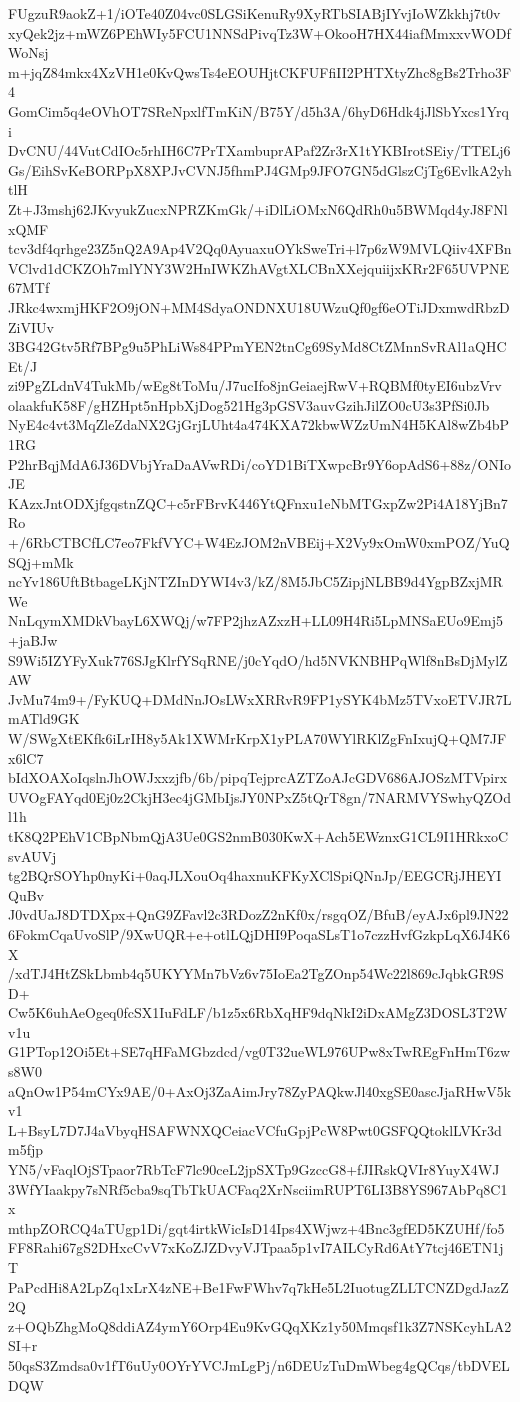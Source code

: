 FUgzuR9aokZ+1/iOTe40Z04vc0SLGSiKenuRy9XyRTbSIABjIYvjIoWZkkhj7t0v
xyQek2jz+mWZ6PEhWIy5FCU1NNSdPivqTz3W+OkooH7HX44iafMmxxvWODfWoNsj
m+jqZ84mkx4XzVH1e0KvQwsTs4eEOUHjtCKFUFfiII2PHTXtyZhc8gBs2Trho3F4
GomCim5q4eOVhOT7SReNpxlfTmKiN/B75Y/d5h3A/6hyD6Hdk4jJlSbYxcs1Yrqi
DvCNU/44VutCdIOc5rhIH6C7PrTXambuprAPaf2Zr3rX1tYKBIrotSEiy/TTELj6
Gs/EihSvKeBORPpX8XPJvCVNJ5fhmPJ4GMp9JFO7GN5dGlszCjTg6EvlkA2yhtlH
Zt+J3mshj62JKvyukZucxNPRZKmGk/+iDlLiOMxN6QdRh0u5BWMqd4yJ8FNlxQMF
tcv3df4qrhge23Z5nQ2A9Ap4V2Qq0AyuaxuOYkSweTri+l7p6zW9MVLQiiv4XFBn
VClvd1dCKZOh7mlYNY3W2HnIWKZhAVgtXLCBnXXejquiijxKRr2F65UVPNE67MTf
JRkc4wxmjHKF2O9jON+MM4SdyaONDNXU18UWzuQf0gf6eOTiJDxmwdRbzDZiVIUv
3BG42Gtv5Rf7BPg9u5PhLiWs84PPmYEN2tnCg69SyMd8CtZMnnSvRAl1aQHCEt/J
zi9PgZLdnV4TukMb/wEg8tToMu/J7ucIfo8jnGeiaejRwV+RQBMf0tyEI6ubzVrv
olaakfuK58F/gHZHpt5nHpbXjDog521Hg3pGSV3auvGzihJilZO0cU3s3PfSi0Jb
NyE4c4vt3MqZleZdaNX2GjGrjLUht4a474KXA72kbwWZzUmN4H5KAl8wZb4bP1RG
P2hrBqjMdA6J36DVbjYraDaAVwRDi/coYD1BiTXwpcBr9Y6opAdS6+88z/ONIoJE
KAzxJntODXjfgqstnZQC+c5rFBrvK446YtQFnxu1eNbMTGxpZw2Pi4A18YjBn7Ro
+/6RbCTBCfLC7eo7FkfVYC+W4EzJOM2nVBEij+X2Vy9xOmW0xmPOZ/YuQSQj+mMk
ncYv186UftBtbageLKjNTZInDYWI4v3/kZ/8M5JbC5ZipjNLBB9d4YgpBZxjMRWe
NnLqymXMDkVbayL6XWQj/w7FP2jhzAZxzH+LL09H4Ri5LpMNSaEUo9Emj5+jaBJw
S9Wi5IZYFyXuk776SJgKlrfYSqRNE/j0cYqdO/hd5NVKNBHPqWlf8nBsDjMylZAW
JvMu74m9+/FyKUQ+DMdNnJOsLWxXRRvR9FP1ySYK4bMz5TVxoETVJR7LmATld9GK
W/SWgXtEKfk6iLrIH8y5Ak1XWMrKrpX1yPLA70WYlRKlZgFnIxujQ+QM7JFx6lC7
bIdXOAXoIqslnJhOWJxxzjfb/6b/pipqTejprcAZTZoAJcGDV686AJOSzMTVpirx
UVOgFAYqd0Ej0z2CkjH3ec4jGMbIjsJY0NPxZ5tQrT8gn/7NARMVYSwhyQZOdl1h
tK8Q2PEhV1CBpNbmQjA3Ue0GS2nmB030KwX+Ach5EWznxG1CL9I1HRkxoCsvAUVj
tg2BQrSOYhp0nyKi+0aqJLXouOq4haxnuKFKyXClSpiQNnJp/EEGCRjJHEYIQuBv
J0vdUaJ8DTDXpx+QnG9ZFavl2c3RDozZ2nKf0x/rsgqOZ/BfuB/eyAJx6pl9JN22
6FokmCqaUvoSlP/9XwUQR+e+otlLQjDHI9PoqaSLsT1o7czzHvfGzkpLqX6J4K6X
/xdTJ4HtZSkLbmb4q5UKYYMn7bVz6v75IoEa2TgZOnp54Wc22l869cJqbkGR9SD+
Cw5K6uhAeOgeq0fcSX1IuFdLF/b1z5x6RbXqHF9dqNkI2iDxAMgZ3DOSL3T2Wv1u
G1PTop12Oi5Et+SE7qHFaMGbzdcd/vg0T32ueWL976UPw8xTwREgFnHmT6zws8W0
aQnOw1P54mCYx9AE/0+AxOj3ZaAimJry78ZyPAQkwJl40xgSE0ascJjaRHwV5kv1
L+BsyL7D7J4aVbyqHSAFWNXQCeiacVCfuGpjPcW8Pwt0GSFQQtoklLVKr3dm5fjp
YN5/vFaqlOjSTpaor7RbTcF7lc90ceL2jpSXTp9GzccG8+fJIRskQVIr8YuyX4WJ
3WfYIaakpy7sNRf5cba9sqTbTkUACFaq2XrNsciimRUPT6LI3B8YS967AbPq8C1x
mthpZORCQ4aTUgp1Di/gqt4irtkWicIsD14Ips4XWjwz+4Bnc3gfED5KZUHf/fo5
FF8Rahi67gS2DHxcCvV7xKoZJZDvyVJTpaa5p1vI7AILCyRd6AtY7tcj46ETN1jT
PaPcdHi8A2LpZq1xLrX4zNE+Be1FwFWhv7q7kHe5L2IuotugZLLTCNZDgdJazZ2Q
z+OQbZhgMoQ8ddiAZ4ymY6Orp4Eu9KvGQqXKz1y50Mmqsf1k3Z7NSKcyhLA2SI+r
50qsS3Zmdsa0v1fT6uUy0OYrYVCJmLgPj/n6DEUzTuDmWbeg4gQCqs/tbDVELDQW
